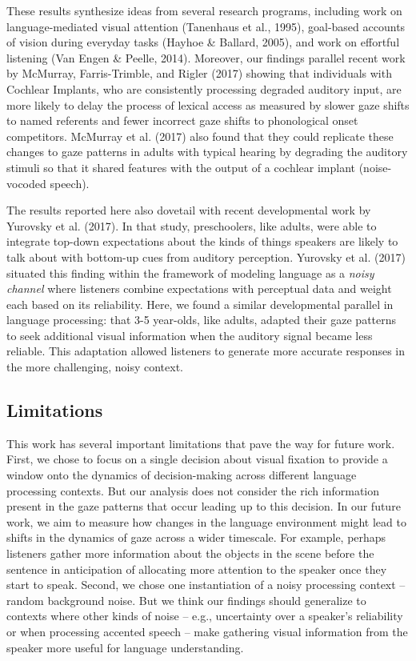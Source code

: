 \documentclass[english,floatsintext,man]{apa6}
\begin{document}
These results synthesize ideas from several research programs, including
work on language-mediated visual attention (Tanenhaus et al., 1995),
goal-based accounts of vision during everyday tasks (Hayhoe \& Ballard,
2005), and work on effortful listening (Van Engen \& Peelle, 2014).
Moreover, our findings parallel recent work by McMurray, Farris-Trimble,
and Rigler (2017) showing that individuals with Cochlear Implants, who
are consistently processing degraded auditory input, are more likely to
delay the process of lexical access as measured by slower gaze shifts to
named referents and fewer incorrect gaze shifts to phonological onset
competitors. McMurray et al. (2017) also found that they could replicate
these changes to gaze patterns in adults with typical hearing by
degrading the auditory stimuli so that it shared features with the
output of a cochlear implant (noise-vocoded speech).

The results reported here also dovetail with recent developmental work
by Yurovsky et al. (2017). In that study, preschoolers, like adults,
were able to integrate top-down expectations about the kinds of things
speakers are likely to talk about with bottom-up cues from auditory
perception. Yurovsky et al. (2017) situated this finding within the
framework of modeling language as a \emph{noisy channel} where listeners
combine expectations with perceptual data and weight each based on its
reliability. Here, we found a similar developmental parallel in language
processing: that 3-5 year-olds, like adults, adapted their gaze patterns
to seek additional visual information when the auditory signal became
less reliable. This adaptation allowed listeners to generate more
accurate responses in the more challenging, noisy context.

\hypertarget{limitations}{%
\subsection{Limitations}\label{limitations}}

This work has several important limitations that pave the way for future
work. First, we chose to focus on a single decision about visual
fixation to provide a window onto the dynamics of decision-making across
different language processing contexts. But our analysis does not
consider the rich information present in the gaze patterns that occur
leading up to this decision. In our future work, we aim to measure how
changes in the language environment might lead to shifts in the dynamics
of gaze across a wider timescale. For example, perhaps listeners gather
more information about the objects in the scene before the sentence in
anticipation of allocating more attention to the speaker once they start
to speak. Second, we chose one instantiation of a noisy processing
context -- random background noise. But we think our findings should
generalize to contexts where other kinds of noise -- e.g., uncertainty
over a speaker's reliability or when processing accented speech -- make
gathering visual information from the speaker more useful for language
understanding.
\end{document}
